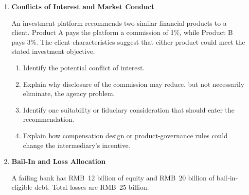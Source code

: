 \begin{enumerate}
A deposit-insurance system covers eligible deposits up to RMB~500,000 per depositor at an institution.

\begin{enumerate}

\item Calculate the insured and uninsured amounts for a depositor with RMB~320,000.

\item Repeat the calculation for a depositor with RMB~800,000.

\item Explain why the second depositor may have stronger incentives to monitor bank risk.

\item Explain how risk-based insurance premiums can partly reduce the moral-hazard problem created by deposit protection.

\end{enumerate}


\item \textbf{Conflicts of Interest and Market Conduct}

An investment platform recommends two similar financial products to a client. Product A pays the platform a commission of 1\%, while Product B pays 3\%. The client characteristics suggest that either product could meet the stated investment objective.

\begin{enumerate}

\item Identify the potential conflict of interest.

\item Explain why disclosure of the commission may reduce, but not necessarily eliminate, the agency problem.

\item Identify one suitability or fiduciary consideration that should enter the recommendation.

\item Explain how compensation design or product-governance rules could change the intermediary's incentive.

\end{enumerate}


\item \textbf{Bail-In and Loss Allocation}

A failing bank has RMB~12 billion of equity and RMB~20 billion of bail-in-eligible debt. Total losses are RMB~25 billion.


\end{enumerate}
